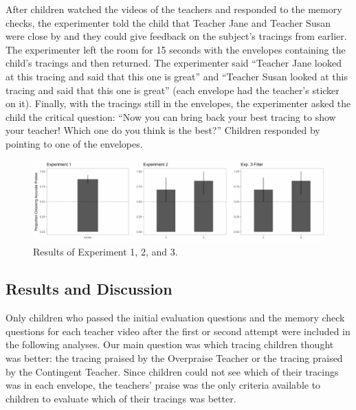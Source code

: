 \documentclass[10pt, letterpaper]{article}
\newenvironment{CodeChunk}{}{}
\begin{document}
After children watched the videos of the teachers and responded to the
memory checks, the experimenter told the child that Teacher Jane and
Teacher Susan were close by and they could give feedback on the
subject's tracings from earlier. The experimenter left the room for 15
seconds with the envelopes containing the child's tracings and then
returned. The experimenter said ``Teacher Jane looked at this tracing
and said that this one is great'' and ``Teacher Susan looked at this
tracing and said that this one is great'' (each envelope had the
teacher's sticker on it). Finally, with the tracings still in the
envelopes, the experimenter asked the child the critical question: ``Now
you can bring back your best tracing to show your teacher! Which one do
you think is the best?'' Children responded by pointing to one of the
envelopes.

\begin{CodeChunk}
\begin{figure}[h]

{\centering \includegraphics{figs/results_adult-1} 

}

\caption[Results of Experiment 1, 2, and 3]{Results of Experiment 1, 2, and 3.}\label{fig:results_adult}
\end{figure}
\end{CodeChunk}

\subsection{Results and Discussion}\label{results-and-discussion-1}

Only children who passed the initial evaluation questions and the memory
check questions for each teacher video after the first or second attempt
were included in the following analyses. Our main question was which
tracing children thought was better: the tracing praised by the
Overpraise Teacher or the tracing praised by the Contingent Teacher.
Since children could not see which of their tracings was in each
envelope, the teachers' praise was the only criteria available to
children to evaluate which of their tracings was better.
\end{document}
